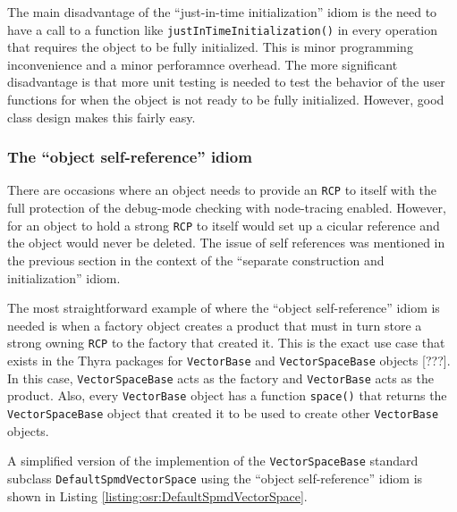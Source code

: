 \documentclass[pdf,ps2pdf,11pt]{SANDreport}
\begin{document}
The main disadvantage of the ``just-in-time initialization'' idiom is
the need to have a call to a function like
{}\texttt{justInTimeInitialization()} in every operation that requires the
object to be fully initialized.  This is minor programming
inconvenience and a minor perforamnce overhead.  The more significant
disadvantage is that more unit testing is needed to test the behavior
of the user functions for when the object is not ready to be fully
initialized.  However, good class design makes this fairly easy.


%
{}\subsubsection{The ``object self-reference'' idiom}
\label{sec:self-references}
%

There are occasions where an object needs to provide an {}\texttt{RCP}
to itself with the full protection of the debug-mode checking with
node-tracing enabled.  However, for an object to hold a strong
{}\texttt{RCP} to itself would set up a cicular reference and the
object would never be deleted.  The issue of self references was
mentioned in the previous section in the context of the ``separate
construction and initialization'' idiom.



The most straightforward example of where the ``object
self-reference'' idiom is needed is when a factory object creates a
product that must in turn store a strong owning {}\texttt{RCP} to the
factory that created it.  This is the exact use case that exists in
the Thyra packages for {}\texttt{VectorBase} and
{}\texttt{VectorSpaceBase} objects [???].  In this case,
{}\texttt{VectorSpaceBase} acts as the factory and
{}\texttt{VectorBase} acts as the product.  Also, every
{}\texttt{VectorBase} object has a function {}\texttt{space()} that
returns the {}\texttt{VectorSpaceBase} object that created it to be
used to create other {}\texttt{VectorBase} objects.

A simplified version of the implemention of the
{}\texttt{VectorSpaceBase} standard subclass
{}\texttt{DefaultSpmdVectorSpace} using the ``object self-reference''
idiom is shown in Listing {}\ref{listing:osr:DefaultSpmdVectorSpace}.
\end{document}

